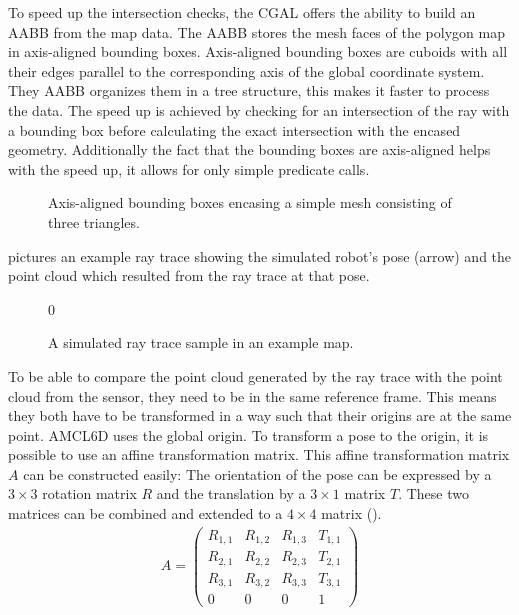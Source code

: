 \documentclass[Thesis.tex]{subfiles}
\begin{document}
To speed up the intersection checks, the \gls{CGAL} offers the ability to build an \gls{AABB}\label{page:aabb} from the map data\cite{cgal:atw-aabb-14b}. The \gls{AABB} stores the mesh faces of the polygon map in axis-aligned bounding boxes. Axis-aligned bounding boxes are cuboids with all their edges parallel to the corresponding axis of the global coordinate system. They \gls{AABB} organizes them in a tree structure, this makes it faster to process the data. 
The speed up is achieved by checking for an intersection of the ray with a bounding box before calculating the exact intersection with the encased geometry. Additionally the fact that the bounding boxes are axis-aligned helps with the speed up, it allows for only simple predicate calls\cite{cgal:atw-aabb-14b}.
\begin{figure}%
  \caption[Axis-aligned bounding box example]{Axis-aligned bounding boxes encasing a simple mesh consisting of three triangles.}%
  \label{fig:aabb_ex}%
\end{figure}
%
 pictures an example ray trace showing the simulated robot's pose (arrow) and the point cloud which resulted from the ray trace at that pose.
\begin{figure}[!htp]
  \caption[Sample ray trace]{A simulated ray trace sample in an example map.}
  \label{fig:raytrace}0
\end{figure}
%
To be able to compare the point cloud generated by the ray trace with the point cloud from the sensor, they need to be in the same reference frame. This means they both have to be transformed in a way such that their origins are at the same point. \gls{AMCL6D} uses the global origin.
To transform a pose to the origin, it is possible to use an affine transformation matrix. This affine transformation matrix $A$ can be constructed easily: The orientation of the pose can be expressed by a $3\times3$ rotation matrix $R$ and the translation by a $3\times1$ matrix $T$. These two matrices can be combined and extended to a $4\times4$ matrix ().
\begin{align}
A = \left(\begin{array}{cccc}
      R_{1,1} & R_{1,2} & R_{1,3} & T_{1,1} \\ 
      R_{2,1} & R_{2,2} & R_{2,3} & T_{2,1} \\ 
      R_{3,1} & R_{3,2} & R_{3,3} & T_{3,1} \\
         0    &    0    &    0    &    1
    \end{array}\right)\label{form:affinetransmatrix}
\end{align}
\end{document}
